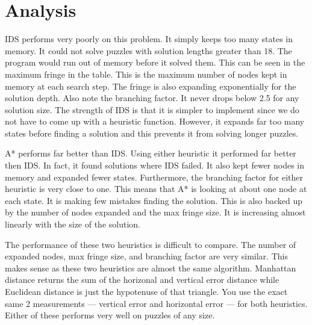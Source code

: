 \documentclass[10pt]{article}
\begin{document}
\section{Analysis}
IDS performs very poorly on this problem.  It simply keeps too many states
in memory.  It could not solve puzzles with solution lengths greater than 18.
The program would run out of memory before it solved them.  This can be seen
in the maximum fringe in the table.  This is the maximum number of nodes kept
in memory at each search step.  The fringe is also expanding exponentially
for the solution depth.  Also note the branching factor.  It never drops below
2.5 for any solution size.  
The strength of IDS is that it is simpler to 
implement since we do not have to come up with a heuristic function.  However, 
it expands far too many states before finding a solution and this prevents it 
from solving longer puzzles.

A* performs far better than IDS.  Using either heuristic it performed far 
better then IDS.  In fact, it found solutions where IDS failed.  It also kept
fewer nodes in memory and expanded fewer states.  Furthermore, the branching 
factor for either heuristic is very close to one.  This means that A* is
looking at about one node at each state.  It is making few mistakes finding
the solution.  This is also backed up by the number of nodes expanded and
the max fringe size.  It is increasing almost linearly with the size of the 
solution.

The performance of these two heuristics is difficult to compare.  The number 
of expanded nodes, max fringe size, and branching factor are very similar.  
This makes sense as these two heuristics are almost the same algorithm.  
Manhattan distance returns the sum of the horizonal and vertical error distance
while Euclidean distance is just the hypotenuse of that triangle.  You use
the exact same 2 measurements --- vertical error and horizontal error --- for
both heuristics.  Either of these performs very well on puzzles of any size.
\end{document}
